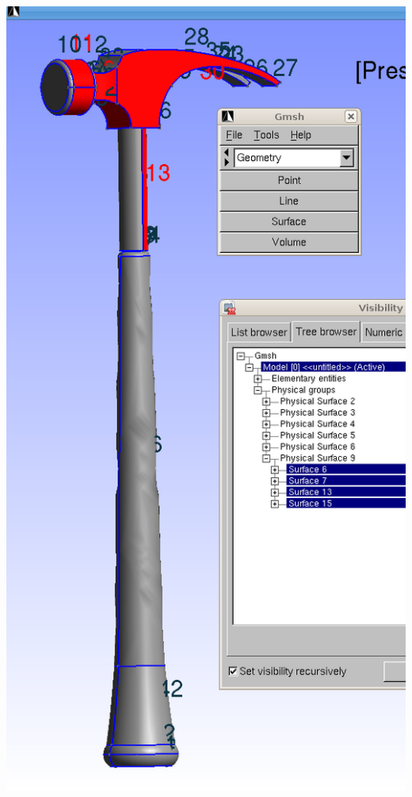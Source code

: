 \begin{frame}
\begin{minipage}{0.31\linewidth}
\begin{center}
      \includegraphics[width=\linewidth]{./EPS/hammer_surfgroups}
    \end{center}
  \end{minipage}
\end{frame}

